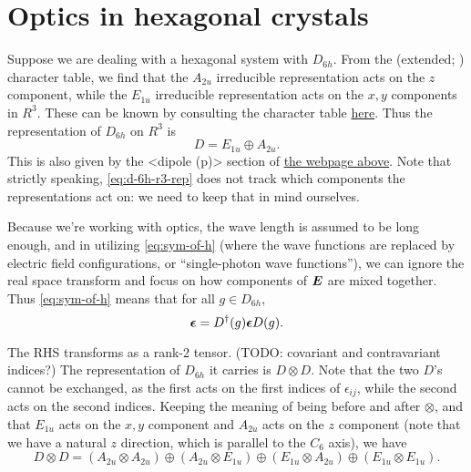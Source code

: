 \documentclass[hyperref, a4paper, 12pt]{article}
\def\texttt#1{<#1>}%
\def\mathbb#1{#1}%
\newcommand{\shortcode}[1]{\texttt{#1}}
\begin{document}
\section{Optics in hexagonal crystals}

Suppose we are dealing with a hexagonal system with $D_{6h}$.
From the (extended; ) character table,
we find that the $A_{2u}$ irreducible representation acts on the $z$ component,
while the $E_{1u}$ irreducible representation acts on the $x, y$ components in $\mathbb{R}^3$.
These can be known by consulting the character table \href{http://symmetry.constructor.university/cgi-bin/group.cgi?group=606&option=4}{here}.
Thus the representation of $D_{6h}$ on $\mathbb{R}^3$ is 
\begin{equation}
    D = E_{1u} \oplus A_{2u}.
    \label{eq:d-6h-r3-rep}
\end{equation}
This is also given by the \shortcode{dipole (p)} section of 
\href{http://symmetry.constructor.university/cgi-bin/group.cgi?group=606&option=4}{the webpage above}.
Note that strictly speaking, \eqref{eq:d-6h-r3-rep} does not track which components the representations act on:
we need to keep that in mind ourselves.

Because we're working with optics, the wave length is assumed to be long enough,
and in utilizing \eqref{eq:sym-of-h} (where the wave functions are replaced by
electric field configurations, or ``single-photon wave functions''),
we can ignore the real space transform and focus on how components of $\vb*{E}$
are mixed together.
Thus \eqref{eq:sym-of-h} means that for all $g \in D_{6h}$,
\begin{equation}
    \vb*{\epsilon} = D^\dag(g) \vb*{\epsilon} D(g).
\end{equation}

The RHS transforms as a rank-2 tensor. (TODO: covariant and contravariant indices?)
The representation of $D_{6h}$ it carries is $D \otimes D$.
Note that the two $D$'s cannot be exchanged,
as the first acts on the first indices of $\epsilon_{ij}$,
while the second acts on the second indices.
Keeping the meaning of being before and after $\otimes$,
and that $E_{1u}$ acts on the $x, y$ component and $A_{2u}$ acts on the $z$ component
(note that we have a natural $z$ direction,
which is parallel to the $C_6$ axis),
we have 
\begin{equation}
    D \otimes D = (A_{2u} \otimes A_{2u}) \oplus 
    (A_{2u} \otimes E_{1u}) \oplus
    (E_{1u} \otimes A_{2u}) \oplus
    (E_{1u} \otimes E_{1u}).
\end{equation}
\end{document}
